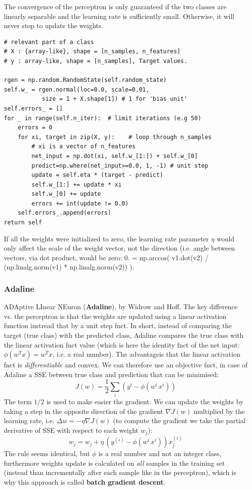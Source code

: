 \documentclass[11pt]{article}
\begin{document}
The convergence of the perceptron is only guaranteed if the two classes are linearly separable and the learning rate is sufficiently small. Otherwise, it will never stop to update the weights. 
\begin{lstlisting}
# relevant part of a class
# X : {array-like}, shape = [n_samples, n_features]
# y : array-like, shape = [n_samples], Target values.

rgen = np.random.RandomState(self.random_state)
self.w_ = rgen.normal(loc=0.0, scale=0.01,
		   size = 1 + X.shape[1]) # 1 for 'bias unit'
self.errors_ = []
for _ in range(self.n_iter):  # limit iterations (e.g 50)
	errors = 0
	for xi, target in zip(X, y):	# loop through n_samples
		# xi is a vector of n_features
		net_input = np.dot(xi, self.w_[1:]) + self.w_[0]
		predict=np.where(net_input>=0.0, 1, -1) # unit step
		update = self.eta * (target - predict)
		self.w_[1:] += update * xi
		self.w_[0] += update
		errors += int(update != 0.0)
	self.errors_.append(errors)
return self
\end{lstlisting}
If all the weights were initialized to zero, the learning rate parameter $\eta$ would only affect the scale of the weight vector, not the direction (i.e. angle between vectors, via dot product, would be zero: 0. = np.arccos( v1.dot(v2) / (np.linalg.norm(v1) * np.linalg.norm(v2)) ).

\subsubsection*{Adaline}
ADAptive LInear NEuron (\textbf{Adaline}), by Widrow and Hoff. The key difference vs. the perceptron is that the weights are updated using a linear activation function instread that by a unit step fnct. In short, instead of comparing the target (true class) with the predicted class, Adaline compares the true class with the linear activation fnct value (which is here the identity fnct of the net input: $\phi(w^T x) = w^T x$, i.e. a real number). The advantageis that the linear activation fnct is \textit{differentiable} and convex. We can therefore use an objective fnct, in case of Adaline a SSE between true class and prediction that can be minimised:
\[ J(w) = \frac{1}{2} \sum_i (y^i - \phi(w^i \, x^i))
\] 
The term $1/2$ is used to make easier the gradient. We can update the weights by taking a step in the opposite direction of the gradient $\nabla J(w)$ multiplied by the learning rate, i.e. $\Delta w = -\eta \nabla J(w)$ (to compute the gradient we take the partial derivative of SSE with respect to each weight $w_j$):
\[ 
w_j = w_j +   \eta \, (y^{(i)} - \phi(w^i \, x^i)) x_j^{(i)}
\]
The rule seems identical, but $\phi$ is a real number and not an integer class, furthermore weights update is calculated on \textit{all} samples in the training set (instead than incrementally after each sample like in the perceptron), which is why this approach is called \textbf{batch gradient descent}.
\end{document}
